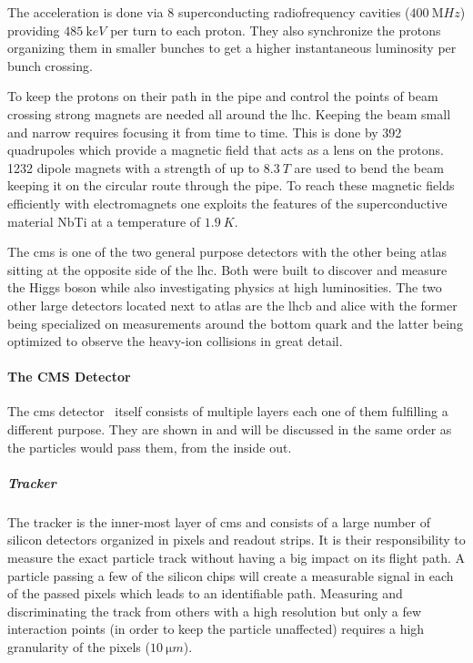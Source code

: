 The acceleration is done via 8 superconducting radiofrequency cavities (\(\SI{400}{\mega Hz}\)) providing \(\SI{485}{\kilo eV}\) per turn to each proton. They also synchronize the protons organizing them in smaller bunches to get a higher instantaneous luminosity per bunch crossing.

To keep the protons on their path in the pipe and control the points of beam crossing strong magnets are needed all around the \gls{lhc}. Keeping the beam small and narrow requires focusing it from time to time. This is done by 392 quadrupoles which provide a magnetic field that acts as a lens on the protons. 1232 dipole magnets with a strength of up to \(\SI{8.3}{T}\) are used to bend the beam keeping it on the circular route through the pipe. To reach these magnetic fields efficiently with electromagnets one exploits the features of the superconductive material NbTi at a temperature of \(\SI{1.9}{K}\).

The \gls{cms} is one of the two general purpose detectors with the other being \gls{atlas} sitting at the opposite side of the \gls{lhc}. Both were built to discover and measure the Higgs boson while also investigating physics at high luminosities. The two other large detectors located next to \gls{atlas} are the \gls{lhcb} and \gls{alice} with the former being specialized on measurements around the bottom quark and the latter being optimized to observe the heavy-ion collisions in great detail.~\cite{lhc}

\paragraph{The CMS Detector}

The \gls{cms} detector~\cite{cms} itself consists of multiple layers each one of them fulfilling a different purpose. They are shown in  and will be discussed in the same order as the particles would pass them, from the inside out.

\subparagraph{Tracker}

The tracker is the inner-most layer of \gls{cms} and consists of a large number of silicon detectors organized in pixels and readout strips. It is their responsibility to measure the exact particle track without having a big impact on its flight path. A particle passing a few of the silicon chips will create a measurable signal in each of the passed pixels which leads to an identifiable path. Measuring and discriminating the track from others with a high resolution but only a few interaction points (in order to keep the particle unaffected) requires a high granularity of the pixels (\(\SI{10}{\micro m}\)).


